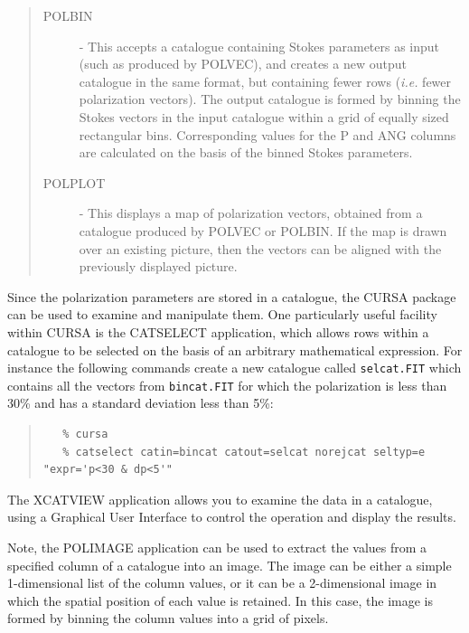 \documentclass[twoside,11pt]{article}
\newcommand{\htmlref}[2]{#1}
\newcommand{\xref}[3]{#1}
\renewcommand{\_}{\texttt{\symbol{95}}}
\newenvironment{myquote}{\begin{quote}\begin{small}}{\end{small}\end{quote}}
\begin{document}
\begin{quote}
\begin{description}
\item [\htmlref{POLBIN}{POLBIN}] - This accepts a catalogue containing Stokes
parameters as input (such as produced by POLVEC), and creates a new
output catalogue in the same format, but containing fewer rows (\emph{i.e.}
fewer polarization vectors). The output catalogue is formed by binning the
Stokes vectors in the input catalogue within a grid of equally sized
rectangular bins. Corresponding values for the P and ANG columns are
calculated on the basis of the binned Stokes parameters.

\item [\htmlref{POLPLOT}{POLPLOT}] - This displays a map of polarization 
vectors, obtained from a catalogue produced by POLVEC or POLBIN. If the
map is drawn over an existing picture, then the vectors can be aligned
with the previously displayed picture.

\end{description}
\end{quote}

Since the polarization parameters are stored in a catalogue, the
\xref{CURSA}{sun190}{} package  can be used to
examine and manipulate them. One particularly useful facility within
CURSA is the \xref{CATSELECT}{sun190}{SELECT} application, which
allows rows within a catalogue to be selected on the basis of an
arbitrary mathematical expression. For instance the following commands
create a new catalogue called \verb+selcat.FIT+ which contains all the
vectors from \verb+bincat.FIT+ for which the polarization is less than
30\% and has a standard deviation less than 5\%:

\begin{myquote}
\begin{verbatim}
   % cursa
   % catselect catin=bincat catout=selcat norejcat seltyp=e "expr='p<30 & dp<5'"
\end{verbatim}
\end{myquote}

The \xref{XCATVIEW}{sun190}{XVIEW} application allows you to examine the
data in a catalogue, using a Graphical User Interface to control the
operation and display the results.

Note, the \htmlref{POLIMAGE}{POLIMAGE} application can be used to extract
the values from a specified column of a catalogue into an image. The image 
can be either a simple 1-dimensional list of the column values, or it can
be a 2-dimensional image in which the spatial position of each value is
retained. In this case, the image is formed by binning the column values
into a grid of pixels.
\end{document}
